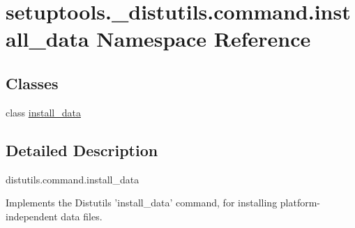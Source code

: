 \hypertarget{namespacesetuptools_1_1__distutils_1_1command_1_1install__data}{}\section{setuptools.\+\_\+distutils.\+command.\+install\+\_\+data Namespace Reference}
\label{namespacesetuptools_1_1__distutils_1_1command_1_1install__data}
\subsection*{Classes}
\begin{DoxyCompactItemize}
\item 
class \hyperlink{classsetuptools_1_1__distutils_1_1command_1_1install__data_1_1install__data}{install\+\_\+data}
\end{DoxyCompactItemize}


\subsection{Detailed Description}
\begin{DoxyVerb}distutils.command.install_data

Implements the Distutils 'install_data' command, for installing
platform-independent data files.\end{DoxyVerb}
 